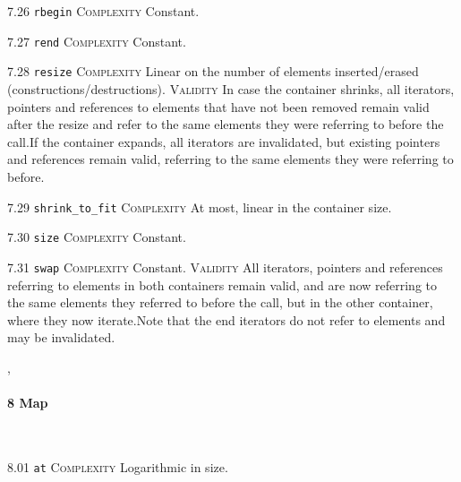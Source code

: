 \noindent\textcolor{cgreen}{7.26 \texttt{rbegin}} \textsc{Complexity} Constant. \vspace{0.5em}

\noindent\textcolor{cgreen}{7.27 \texttt{rend}} \textsc{Complexity} Constant. \vspace{0.5em}

\noindent\textcolor{corange}{7.28 \texttt{resize}} \textsc{Complexity} Linear on the number of elements inserted/erased (constructions/destructions). \textsc{Validity} In case the container shrinks, all iterators, pointers and references to elements that have not been removed remain valid after the resize and refer to the same elements they were referring to before the call.If the container expands, all iterators are invalidated, but existing pointers and references remain valid, referring to the same elements they were referring to before.\vspace{0.5em}

\noindent\textcolor{corange}{7.29 \texttt{shrink\_to\_fit}} \textsc{Complexity} At most, linear in the container size. \vspace{0.5em}

\noindent\textcolor{cgreen}{7.30 \texttt{size}} \textsc{Complexity} Constant. \vspace{0.5em}

\noindent\textcolor{cgreen}{7.31 \texttt{swap}} \textsc{Complexity} Constant. \textsc{Validity} All iterators, pointers and references referring to elements in both containers remain valid, and are now referring to the same elements they referred to before the call, but in the other container, where they now iterate.Note that the end iterators do not refer to elements and may be invalidated.\vspace{0.5em}


\sep
{}
\paragraph{8 Map}\mbox{}\\
\noindent\textcolor{clime}{8.01 \texttt{at}} \textsc{Complexity} Logarithmic in size. \vspace{0.5em}

